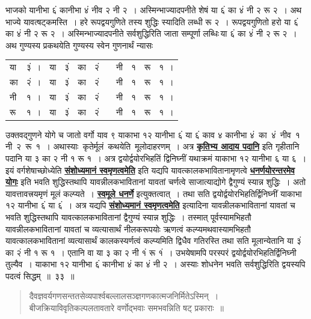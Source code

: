 \documentclass[11pt, openany]{book}
\begin{document}
\noindent भाजको यानीभा ६ं कानीभा ४ं नीव २ नी २~। अस्मिन्भाज्यादपनीते शेषं या ६ं
का ४ं नी २ रू २~। अथ भाज्ये यावत्षट्कमस्ति~। हरे रूपद्वयगुणिते तस्य
शुद्धिः स्यादिति लब्धी रू २~। रूपद्वयगुणितो हरो या ६ं का ४ं नी २ रू २~।
अस्मिन्भाज्यादपनीते सर्वशुद्धिरिति जाता सम्पूर्णा लब्धिः\textendash \,या ६ं का ४ं नी २ रू २~। अथ गुण्यस्य प्रकथयेति गुण्यस्य स्वेन गुणनार्थं न्यासः\textendash 

\begin{table}[h!]
    \centering\s
    \begin{tabular}{lllllp{0.5cm}lllll}
  या &३ं~।& या& ३ं& का&२ं&& नी& १& रू& १~।\\
 का &२ं~। &या& ३ं& का&२ं&& नी& १& रू &१~। \\
 नी &१~। &या& ३ं& का&२ं&& नी& १& रू &१~। \\
 रू &१~।& या& ३ं& का& २ं&& नी& १& रू &१~।
    \end{tabular}
\end{table}

\noindent उक्तवद्गुणने योगे च जातो वर्गो याव ९ याकाभा १२ यानीभा ६ं या ६ं काव ४ कानीभा ४ं \,का \,४ं \,नीव \,१ \,नी \,२ \,रू \,१~। अथास्याः \,कृतेर्मूलं \,कथयेति \,मूलोदाहरणम्~। अत्र \hyperref[31]{\textbf{कृतिभ्य आदाय पदानि}} इति गृहीतानि पदानि या ३ का 
२ नी १ रू १~। अत्र द्वयोर्द्वयोरभिहतिं द्विनिघ्नीं यथाक्रमं याकाभा १२
यानीभा ६ या ६~। इयं वर्गशेषाच्छोध्येति 
\hyperref[7]{\textbf{संशोध्यमानं स्वमृणत्वमेति}} इति 
यद्यपि यावत्कालकभावितानामृणत्वे \hyperref[3]{\textbf{धनर्णयोरन्तरमेव योगः}} इति भवति शुद्धिस्तथापि यावन्नीलकभावितानां यावतां चर्णत्वे साजात्याद्योगे द्वैगुण्यं स्यान्न शुद्धिः~। 
अतो यावत्तावत्त्रयमृणं मूलं कल्प्यते~। \hyperref[13]{\textbf{स्वमूले धनर्णे}} इत्युक्तत्वात्~। तथा सति द्वयोर्द्वयोरभिहतिर्द्विनिघ्नीं याकाभा १२ यानीभा ६ं या ६ं~। अत्र यद्यपि \hyperref[7]{\textbf{संशोध्यमानं स्वमृणत्वमेति}} इत्यादिना यावन्नीलकभावितानां यावतां च भवति
शुद्धिस्तथापि यावत्कालकभावितानां द्वैगुण्यं स्यान्न शुद्धिः~।
तस्मात् पूर्वस्यामभिहतौ यावन्नीलकभावितानां यावतां च व्यत्यासार्थं
नीलकरूपयोः ऋणत्वं कल्प्यमथवास्यामभिहतौ यावत्कालकभावितानां व्यत्यासार्थं
कालकस्यर्णत्वं कल्प्यमिति द्विधैव गतिरस्ति तथा सति मूलान्येतानि या ३ं का
२ं नी १ रू १~। एतानि वा या ३ का २ नी १ं रू १ं~। उभयेषामपि परस्परं
द्वयोर्द्वयोरभिहतिर्द्विनिघ्नी तुल्यैव~। याकाभा १२ यानीभा ६ं कानीभा ४ं का ४ं
नी २~। अस्याः शोधनेन भवति सर्वशुद्धिरिति द्वयस्यपि पदत्वं सिद्धम्~॥~३३~॥
\newpage

\begin{quote}
{\qt दैवज्ञवर्यगणसन्ततसेव्यपार्श्वबल्लालसञ्ज्ञगणकात्मजनिर्मितेऽस्मिन्~।\\
\indent बीजक्रियाविवृतिकल्पलतावतारे वर्णोद्भवाः समभवन्निति षट् प्रकाराः~॥ }\end{quote}
\end{document}
